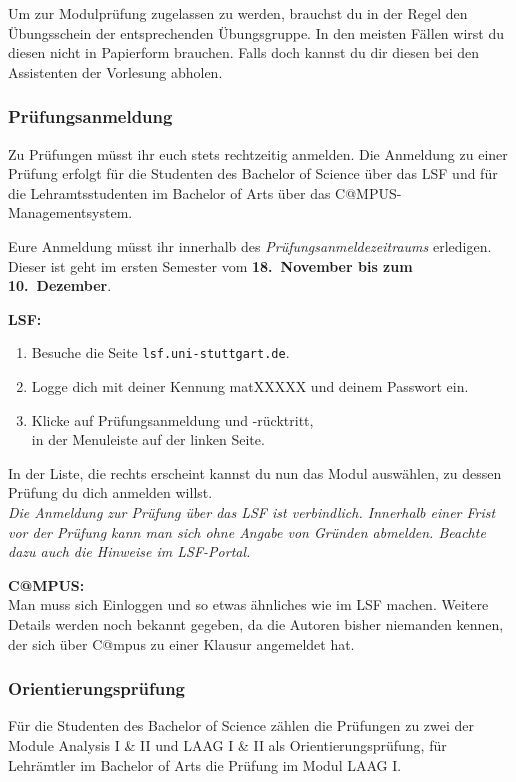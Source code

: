 Um zur Modulprüfung zugelassen zu werden,
brauchst du in der Regel den Übungsschein
der entsprechenden Übungsgruppe.
In den meisten Fällen wirst du diesen nicht in Papierform brauchen.
Falls doch kannst du dir diesen bei den Assistenten der Vorlesung abholen.


\subsubsection{Prüfungsanmeldung}\label{sssec:pa}

Zu Prüfungen müsst ihr euch stets rechtzeitig anmelden.
Die Anmeldung zu einer Prüfung erfolgt
für die Studenten des Bachelor of Science
über das LSF
und für die Lehramtsstudenten im Bachelor of Arts
über das C@MPUS-Managementsystem.

Eure Anmeldung müsst ihr innerhalb
des {\it Prüfungsanmeldezeitraums} erledigen.
Dieser ist geht im ersten Semester
vom {\bf 18.~November bis zum 10.~Dezember}.

{\bf LSF:}
\begin{enumerate}
\item
Besuche die Seite {\small\verb|lsf.uni-stuttgart.de|}.
\item
Logge dich mit deiner Kennung matXXXXX und deinem Passwort ein.
\item
Klicke auf \glqq Prüfungsanmeldung und -rücktritt\grqq,\\
in der Menuleiste auf der linken Seite.
\end{enumerate}
In der Liste, die rechts erscheint
kannst du nun das Modul auswählen,
zu dessen Prüfung du dich anmelden willst.\\
{\it Die Anmeldung zur Prüfung über das LSF ist verbindlich.
Innerhalb einer Frist vor der Prüfung
kann man sich ohne Angabe von Gründen abmelden.
Beachte dazu auch die Hinweise im LSF-Portal.}

{\bf C@MPUS:}\\
Man muss sich Einloggen und
so etwas ähnliches wie im LSF machen.
Weitere Details werden noch bekannt gegeben,
da die Autoren bisher niemanden kennen, der sich über C@mpus
zu einer Klausur angemeldet hat.

\subsubsection{Orientierungsprüfung}\label{sssec:or}

Für die Studenten des Bachelor of Science
zählen die Prüfungen zu zwei der Module Analysis I \& II
und LAAG I \& II als Orientierungsprüfung,
für Lehrämtler im Bachelor of Arts die Prüfung im Modul LAAG I.

